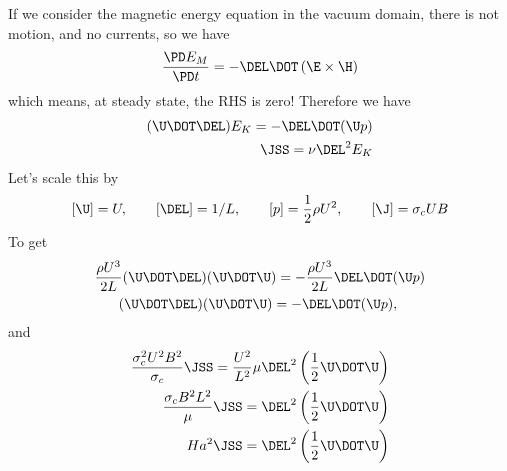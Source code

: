 \documentclass[11pt]{article}
\begin{document}
If we consider the magnetic energy equation in the vacuum domain, there is not motion, and no currents, so we have
\begin{equation}
	\frac{\PD E_M}{\PD t} =	- \DEL \DOT \left(\E \times \H \right)
\end{equation}
which means, at steady state, the RHS is zero! Therefore we have
\begin{equation}\begin{aligned}
	(\U \DOT \DEL) E_K = - \DEL \DOT (\U p) \\
	\JSS = \nu \DEL^2 E_K
\end{aligned}\end{equation}
Let's scale this by
\begin{equation}\begin{aligned}
	[\U] = U, \qquad
	[\DEL] = 1/L, \qquad
	[p] = \frac{1}{2} \rho U^2, \qquad
	[\J] = \sigma_c U B
\end{aligned}\end{equation}
To get
\begin{equation}\begin{aligned}
	\frac{\rho U^3}{2L} (\U \DOT \DEL) ( \U \DOT \U ) = 
	- \frac{\rho U^3}{2L} \DEL \DOT (\U p) \\
	(\U \DOT \DEL) ( \U \DOT \U ) = 
	- \DEL \DOT (\U p), \qquad
\end{aligned}\end{equation}
and
\begin{equation}\begin{aligned}
	\frac{\sigma_c^2 U^2 B^2}{\sigma_c} \JSS = 
	\frac{U^2}{L^2} \mu \DEL^2 \left( \frac{1}{2} \U \DOT \U \right) \\
	\frac{\sigma_c B^2 L^2}{\mu} \JSS = 
	\DEL^2 \left( \frac{1}{2} \U \DOT \U \right) \\
	Ha^2 \JSS = 
	\DEL^2 \left( \frac{1}{2} \U \DOT \U \right)
\end{aligned}\end{equation}

\end{document}
